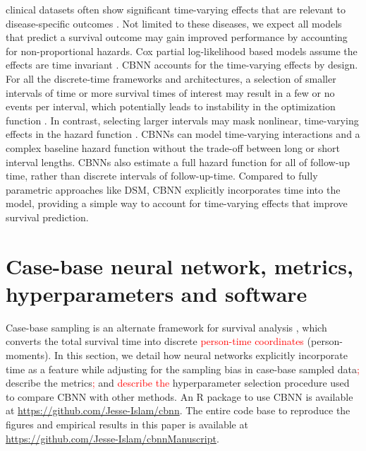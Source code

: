 \documentclass[preprint,12pt,authoryear]{elsarticle}
\begin{document}
 clinical datasets often show significant time-varying effects that are relevant to disease-specific outcomes \citep{coradini2000time}\citep{gao2006time} \citep{na2020time} \citep{zhu2022time} \citep{salmon2023clinical}. Not limited to these diseases, we expect all models that predict a survival outcome may gain improved performance by accounting for non-proportional hazards. Cox partial log-likelihood based models assume the effects are time invariant \citep{cox1972regression}. CBNN accounts for the time-varying effects by design. For all the discrete-time frameworks and architectures, a selection of smaller intervals of time or more survival times of interest may result in a few or no events per interval, which potentially leads to instability in the optimization function \citep{RJ-2022-052}. In contrast, selecting larger intervals may mask nonlinear, time-varying effects in the hazard function \citep{RJ-2022-052}. CBNNs can model time-varying interactions and a complex baseline hazard function without the trade-off between long or short interval lengths. CBNNs also estimate a full hazard function for all of follow-up time, rather than discrete intervals of follow-up-time. Compared to fully parametric approaches like DSM, CBNN explicitly incorporates time into the model, providing a simple way to account for time-varying effects that improve survival prediction.


\color{black}

\hypertarget{methods}{%
\section{Case-base neural network, metrics, hyperparameters and
software}\label{methods}}

Case-base sampling is an alternate framework for survival analysis \citep{hanley2009},
which converts the total survival time into discrete \textcolor{red}{person-time coordinates} (person-moments). In this section, we detail how neural networks explicitly incorporate time as a feature while adjusting for the sampling bias in case-base sampled data\textcolor{red}{;} describe the metrics\textcolor{red}{;} and \textcolor{red}{describe the} hyperparameter selection procedure used to compare
CBNN with other methods. An R package to use CBNN is available at \url{https://github.com/Jesse-Islam/cbnn}. The entire code base to reproduce the figures and empirical results in this paper is available at \url{https://github.com/Jesse-Islam/cbnnManuscript}.
\end{document}
